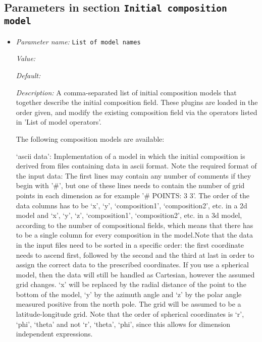 \subsection{Parameters in section \tt Initial composition model}
\label{parameters:Initial_20composition_20model}

\begin{itemize}
\item {\it Parameter name:} {\tt List of model names}
\label{parameters:Initial composition model/List of model names}


{\it Value:} 


{\it Default:} 


{\it Description:} A comma-separated list of initial composition models that together describe the initial composition field. These plugins are loaded in the order given, and modify the existing composition field via the operators listed in 'List of model operators'.

The following composition models are available:

`ascii data': Implementation of a model in which the initial composition is derived from files containing data in ascii format. Note the required format of the input data: The first lines may contain any number of comments if they begin with '\#', but one of these lines needs to contain the number of grid points in each dimension as for example '\# POINTS: 3 3'. The order of the data columns has to be `x', `y', `composition1', `composition2', etc. in a 2d model and `x', `y', `z', `composition1', `composition2', etc. in a 3d model, according to the number of compositional fields, which means that there has to be a single column for every composition in the model.Note that the data in the input files need to be sorted in a specific order: the first coordinate needs to ascend first, followed by the second and the third at last in order to assign the correct data to the prescribed coordinates. If you use a spherical model, then the data will still be handled as Cartesian, however the assumed grid changes. `x' will be replaced by the radial distance of the point to the bottom of the model, `y' by the azimuth angle and `z' by the polar angle measured positive from the north pole. The grid will be assumed to be a latitude-longitude grid. Note that the order of spherical coordinates is `r', `phi', `theta' and not `r', `theta', `phi', since this allows for dimension independent expressions.


\end{itemize}
